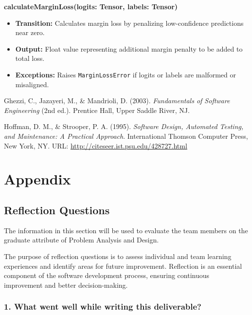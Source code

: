 \documentclass[12pt, titlepage]{article}
\begin{document}
\textbf{calculateMarginLoss(logits: Tensor, labels: Tensor)}

\begin{itemize}
    \item \textbf{Transition:} Calculates margin loss by penalizing low-confidence predictions near zero.
    \item \textbf{Output:} Float value representing additional margin penalty to be added to total loss.
    \item \textbf{Exceptions:} Raises \texttt{MarginLossError} if logits or labels are malformed or misaligned.
\end{itemize}




\begin{thebibliography}{9}

Ghezzi, C., Jazayeri, M., \& Mandrioli, D. (2003).
\textit{Fundamentals of Software Engineering} (2nd ed.). 
Prentice Hall, Upper Saddle River, NJ.

Hoffman, D. M., \& Strooper, P. A. (1995). 
\textit{Software Design, Automated Testing, and Maintenance: A Practical Approach}. 
International Thomson Computer Press, New York, NY. 
URL: \url{http://citeseer.ist.psu.edu/428727.html}

\end{thebibliography}





\newpage

\section{Appendix}
\label{sec:appendix}

\subsection{Reflection Questions}
\label{sec:reflectionquestions}

The information in this section will be used to evaluate the team members on the graduate attribute of Problem Analysis and Design. 

The purpose of reflection questions is to assess individual and team learning experiences and identify areas for future improvement. Reflection is an essential component of the software development process, ensuring continuous improvement and better decision-making.

\subsubsection{1. What went well while writing this deliverable?}
\label{sec:wentwell}
\end{document}
